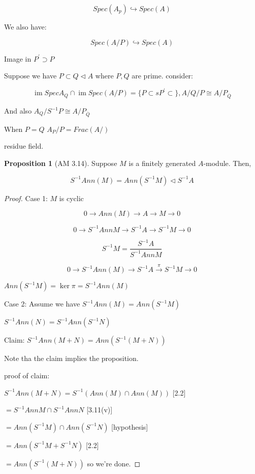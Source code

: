 \documentclass{article}
\theoremstyle{definition}
\newtheorem{proposition}{Proposition}
\newcommand{\im}{\operatorname{im}}
\begin{document}
\[
    Spec(A_p) \hookrightarrow Spec(A)
\]

We also have:

\[
    Spec(A / P) \hookrightarrow Spec(A)
\]

Image in \(P^{\prime} \supset P\) 

Suppose we have \(P \subset Q \triangleleft A\) where \(P,Q\) are prime. consider:

\[
    \im Spec A_Q \cap \im Spec(A / P) = \{ P \subset s P^{\prime} \subset  \}, A / Q / P \cong A / P_{\overline{Q} }
\]

And also \(A_Q / S ^{-1} P \cong A / P_{\overline{Q} }\) 

When \(P=Q\) \(A_P / P = Frac(A/)\)  

residue field.

\begin{proposition}
    [AM 3.14]

    Suppose \(M\) is a finitely generated \(A\)-module. Then,

    \[
        S ^{-1} Ann(M) = Ann(S ^{-1} M) \triangleleft S ^{-1} A
    \]
\end{proposition}

\begin{proof}
    Case 1: \(M\) is cyclic

    \[
        0 \to Ann(M) \to A \to M \to 0
    \]

    \[
        0 \to S ^{-1} An n M \to S ^{-1} A \to S ^{-1} M \to 0
    \]

    \[
        S ^{-1} M = \frac{S ^{-1} A}{S ^{-1} An n M}
    \]

    \[
        0 \to S ^{-1} An n(M) \to S ^{-1} A \overset{\pi }{\to } S ^{-1} M \to 0
    \]

    \(An n(S ^{-1} M) = \ker \pi = S ^{-1} An n(M)\) 

    Case 2: Assume we have \(S ^{-1} A n n(M) = A n n (S ^{-1} M)\)
    
    \(S ^{-1} A n n(N) = S ^{-1} A n n (S ^{-1} N)\)
    
    Claim: \(S ^{-1} A n n(M + N) = A n n(S ^{-1} (M + N))\)
    
    Note tha the claim implies the proposition.

    proof of claim:

    \(S ^{-1} A n n(M + N) = S ^{-1} (A n n(M) \cap A n n(M))\) [2.2]

    \(= S ^{-1} A n n M \cap S ^{-1} A n n N\) [3.11(v)]

    \(= An n (S ^{-1} M) \cap A n n(S ^{-1} N)\) [hypothesis]

    \(= A n n (S ^{-1} M + S ^{-1} N)\) [2.2]

    \(= A n n(S ^{-1} (M + N))\) so we're done.

\end{proof}
\end{document}
